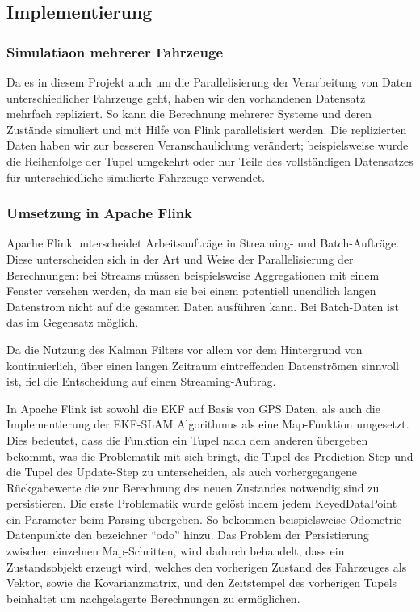 \documentclass[11pt]{article}
\begin{document}
\subsection{Implementierung}

\subsubsection{Simulatiaon mehrerer Fahrzeuge}
Da es in diesem Projekt auch um die Parallelisierung der Verarbeitung von Daten unterschiedlicher Fahrzeuge geht, haben wir den vorhandenen Datensatz mehrfach repliziert. So kann die Berechnung mehrerer Systeme und deren Zustände simuliert und mit Hilfe von Flink parallelisiert werden. Die replizierten Daten haben wir zur besseren Veranschaulichung verändert; beispielsweise wurde die Reihenfolge der Tupel umgekehrt oder nur Teile des vollständigen Datensatzes für unterschiedliche simulierte Fahrzeuge verwendet.

\subsubsection{Umsetzung in Apache Flink}
Apache Flink unterscheidet Arbeitsaufträge in Streaming- und Batch-Auf\-trä\-ge. Diese unterscheiden sich in der Art und Weise der Parallelisierung der Berechnungen: bei Streams müssen beispielsweise Aggregationen mit einem Fenster versehen werden, da man sie bei einem potentiell unendlich langen Datenstrom nicht auf die gesamten Daten ausführen kann. Bei Batch-Daten ist das im Gegensatz möglich.

Da die Nutzung des Kalman Filters vor allem vor dem Hintergrund von kontinuierlich, über einen langen Zeitraum eintreffenden Datenströmen sinnvoll ist, fiel die Entscheidung auf einen Streaming-Auftrag.

In Apache Flink ist sowohl die EKF auf Basis von GPS Daten, als auch die Implementierung der EKF-SLAM Algorithmus als eine Map-Funktion umgesetzt. Dies bedeutet, dass die Funktion ein Tupel nach dem anderen übergeben bekommt, was die Problematik mit sich bringt, die Tupel des Prediction-Step und die Tupel des Update-Step zu unterscheiden, als auch vorhergegangene Rückgabewerte die zur Berechnung des neuen Zustandes notwendig sind zu persistieren. Die erste Problematik wurde gelöst indem jedem KeyedDataPoint ein Parameter beim Parsing übergeben. So bekommen beispielsweise Odometrie Datenpunkte den bezeichner “odo” hinzu. Das Problem der Persistierung zwischen einzelnen Map-Schritten, wird dadurch behandelt, dass ein Zustandsobjekt erzeugt wird, welches den vorherigen Zustand des Fahrzeuges als Vektor, sowie die Kovarianzmatrix, und den Zeitstempel des vorherigen Tupels beinhaltet um nachgelagerte Berechnungen zu ermöglichen.
\end{document}
